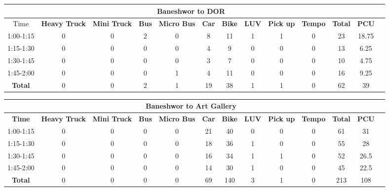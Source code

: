 \begin{landscape}
\centering
\begin{table}[h!]
\centering
\begin{tabular}{|c|c|c|c|c|c|c|c|c|c|c|c|c|}
    \hline
    \multicolumn{12}{|c|}{\textbf{Baneshwor to DOR}} \\
    \hline
        Time & \textbf{Heavy Truck} & \textbf{Mini Truck} & \textbf{Bus} & \textbf{Micro Bus} & \textbf{Car} & \textbf{Bike} & \textbf{LUV} & \textbf{Pick up} & \textbf{Tempo} & \textbf{\textbf{Total}} & \textbf{PCU} \\
    \hline
1:00-1:15	&0	&0	&2	&0	&8	&11	&1	&1	&0	&23	&18.75 \\ \hline
1:15-1:30	&0	&0	&0	&0	&4	&9	&0	&0	&0	&13	&6.25 \\ \hline
1:30-1:45	&0	&0	&0	&0	&3	&7	&0	&0	&0	&10	&4.75 \\ \hline
1:45-2:00	&0	&0	&0	&1	&4	&11	&0	&0	&0	&16	&9.25 \\ \hline
\textbf{Total}	&0	&0	&2	&1	&19	&38	&1	&1	&0	&62	&39 \\ \hline

\end{tabular}

\vspace{0.5cm}

\begin{tabular}{|c|c|c|c|c|c|c|c|c|c|c|c|c|}
    \hline
    \multicolumn{12}{|c|}{\textbf{Baneshwor to Art Gallery}} \\
    \hline
    \textbf{Time} & \textbf{Heavy Truck} & \textbf{Mini Truck} & \textbf{Bus} & \textbf{Micro Bus} & \textbf{Car} & \textbf{Bike} & \textbf{LUV} & \textbf{Pick up} & \textbf{Tempo} & \textbf{\textbf{Total}} & \textbf{PCU} \\
    \hline
1:00-1:15	&0	&0	&0	&0	&21	&40	&0	&0	&0	&61	&31 \\ \hline
1:15-1:30	&0	&0	&0	&0	&18	&36	&1	&0	&0	&55	&28 \\ \hline
1:30-1:45	&0	&0	&0	&0	&16	&34	&1	&1	&0	&52	&26.5 \\ \hline
1:45-2:00	&0	&0	&0	&0	&14	&30	&1	&0	&0	&45	&22.5 \\ \hline
\textbf{Total}	&0	&0	&0	&0	&69	&140	&3	&1	&0	&213	&108 \\ \hline


\end{tabular}



\vspace{0.5cm}


\end{table}
\end{landscape}
